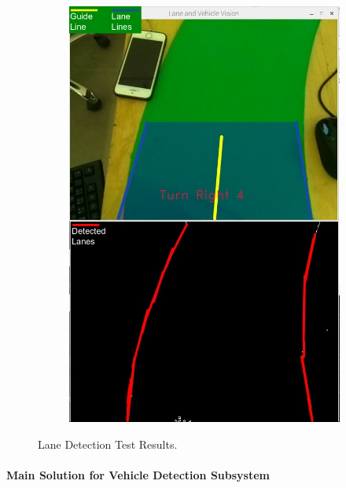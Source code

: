 \documentclass[a4paper,12pt]{article}
\begin{document}
\begin{figure}[H]
\begin{subfigure}{.5\textwidth}
	  		\caption{\label{fig:detection-case1} }
		\end{subfigure}%
		\begin{subfigure}{.5\textwidth}
	  		\centering
			\includegraphics[width=0.48\unitlength]{images/detection2-legend}
	  		\caption{\label{fig:detection-case2}}
		\end{subfigure}
	\caption{\label{fig:detection-test-results}Lane Detection Test Results. }
	\end{figure}
	
	
	
	
	\paragraph{Main Solution for  Vehicle Detection Subsystem}
	
\end{document}
